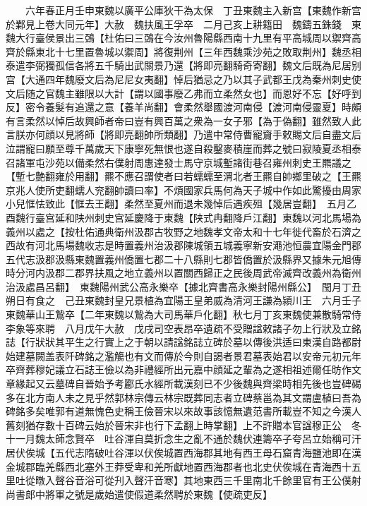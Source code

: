 　　六年春正月壬申東魏以廣平公庫狄干為太保　丁丑東魏主入新宫【東魏作新宫於鄴見上卷大同元年】大赦　魏扶風王孚卒　二月己亥上耕籍田　魏鑄五銖錢　東魏大行臺侯景出三鵶【杜佑曰三鵶在今汝州魯陽縣西南十九里有平高城周以禦齊高齊於縣東北十七里置魯城以禦周】將復荆州【三年西魏乘沙苑之敗取荆州】魏丞相泰遣李弼獨孤信各將五千騎出武關景乃還【將即亮翻騎奇寄翻】魏文后既為尼居别宫【大通四年魏廢文后為尼尼女夷翻】悼后猶忌之乃以其子武都王戊為秦州刺史使文后随之官魏主雖限以大計【謂以國事廢乙弗而立柔然女也】而恩好不忘【好呼到反】密令養髮有追還之意【養羊尚翻】會柔然舉國渡河南侵【渡河南侵靈夏】時頗有言柔然以悼后故興師者帝曰豈有興百萬之衆為一女子邪【為于偽翻】雖然致人此言朕亦何顔以見將師【將即亮翻帥所類翻】乃遣中常侍曹寵齎手敕賜文后自盡文后泣謂寵曰願至尊千萬歲天下康寧死無恨也遂自殺鑿麥積崖而葬之號曰寂陵夏丞相泰召諸軍屯沙苑以備柔然右僕射周惠達發士馬守京城塹諸街巷召雍州刺史王羆議之【塹七艶翻雍於用翻】羆不應召謂使者曰若蠕蠕至渭北者王羆自帥鄉里破之【王羆京兆人使所吏翻蠕人兖翻帥讀曰率】不煩國家兵馬何為天子城中作如此驚擾由周家小兒恇怯致此【恇去王翻】柔然至夏州而退未幾悼后遇疾殂【幾居豈翻】　五月乙酉魏行臺宫延和陕州刺史宫延慶降于東魏【陕式冉翻降戶江翻】東魏以河北馬場為義州以處之【按杜佑通典衛州汲郡古牧野之地魏孝文帝太和十七年徙代畜於石濟之西故有河北馬場魏收志是時置義州治汲郡陳城領五城義寧新安澠池恒農宜陽金門郡五代志汲郡汲縣東魏置義州僑置七郡二十八縣則七郡皆僑置於汲縣界又據朱元旭傳時分河内汲郡二郡界扶風之地立義州以置關西歸正之民後周武帝滅齊改義州為衛州治汲處昌呂翻】　東魏陽州武公高永樂卒【據北齊書高永樂封陽州縣公】　閠月丁丑朔日有食之　己丑東魏封皇兄景植為宜陽王皇弟威為清河王謙為潁川王　六月壬子東魏華山王鷙卒【二年東魏以鷙為大司馬華戶化翻】秋七月丁亥東魏使兼散騎常侍李象等來聘　八月戊午大赦　戊戌司空表昂卒遺疏不受贈諡敕諸子勿上行狀及立銘誌【行狀狀其平生之行實上之于朝以請諡銘誌立碑於墓以傳後洪适曰東漢自路都尉始建墓闕盖表阡碑銘之濫觴也有文而傳於今則自謁者景君墓表始君以安帝元初元年卒齊葬穆妃議立石誌王儉以為非禮經所出元嘉中顔延之輩為之遂相祖述爾任昉作文章緣起又云墓碑自晉始予考酈氏水經所載漢刻已不少後魏與齊梁時相先後也豈碑碣多在北方南人未之見乎然郭林宗傳云林宗既葬同志者立碑蔡邕為其文謂盧植曰吾為碑銘多矣唯郭有道無愧色史稱王儉晉宋以來故事該憶無遺范書所載豈不知之今漢人舊刻猶存數十百碑云始於晉宋非也行下孟翻上時掌翻】上不許贈本官諡穆正公　冬十一月魏太師念賢卒　吐谷渾自莫折念生之亂不通於魏伏連籌卒子夸呂立始稱可汗居伏俟城【五代志隋破吐谷渾以伏俟城置西海郡其地有西王母石窟青海鹽池即在漢金城郡臨羌縣西北塞外王莽受卑和羌所獻地置西海郡者也北史伏俟城在青海西十五里吐從暾入聲谷音浴可從刋入聲汗音寒】其地東西三千里南北千餘里官有王公僕射尚書郎中將軍之號是歲始遣使假道柔然聘於東魏【使疏吏反】

